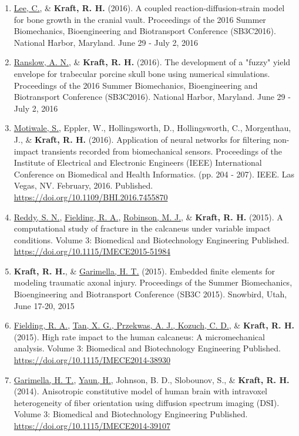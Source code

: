 \documentclass[a4paper,10pt]{article}
\begin{document}
\begin{enumerate}
  \item \underline{Lee, C.}, \&
 \textbf{\textbf{Kraft,} R. H.} (2016). A coupled reaction-diffusion-strain model for bone growth in the cranial vault. Proceedings of the 2016 Summer Biomechanics, Bioengineering and Biotransport Conference (SB3C2016).    
National Harbor, Maryland. June 29 - July 2, 2016
  \item \underline{Ranslow, A. N.}, \&
 \textbf{\textbf{Kraft,} R. H.} (2016). The development of a "fuzzy" yield envelope for trabecular porcine skull bone using numerical simulations. Proceedings of the 2016 Summer Biomechanics, Bioengineering and Biotransport Conference (SB3C2016).    
National Harbor, Maryland. June 29 - July 2, 2016
  \item \underline{Motiwale, S.}, Eppler, W., Hollingsworth, D., Hollingsworth, C., Morgenthau, J., \&
 \textbf{\textbf{Kraft,} R. H.} (2016). Application of neural networks for filtering non-impact transients recorded from biomechanical sensors. Proceedings of the Institute of Electrical and Electronic Engineers (IEEE) International Conference on Biomedical and Health Informatics. (pp. 204 - 207). IEEE.  
Las Vegas, NV. February, 2016. Published. \url{https://doi.org/10.1109/BHI.2016.7455870}
  \item \underline{Reddy, S. N.}, \underline{Fielding, R. A.}, \underline{Robinson, M. J.}, \&
 \textbf{\textbf{Kraft,} R. H.} (2015). A computational study of fracture in the calcaneus under variable impact conditions. Volume 3: Biomedical and Biotechnology Engineering Published. \url{https://doi.org/10.1115/IMECE2015-51984}
  \item \textbf{\textbf{Kraft,} R. H.}, \&
 \underline{Garimella, H. T.} (2015). Embedded finite elements for modeling traumatic axonal injury. Proceedings of the Summer Biomechanics, Bioengineering and Biotransport Conference    (SB3C 2015).    
Snowbird, Utah, June 17-20, 2015
  \item \underline{Fielding, R. A.}, \underline{Tan, X. G., Przekwas, A. J., Kozuch, C. D.}, \&
 \textbf{\textbf{Kraft,} R. H.} (2015). High rate impact to the human calcaneus: A micromechanical analysis. Volume 3: Biomedical and Biotechnology Engineering Published. \url{https://doi.org/10.1115/IMECE2014-38930}
  \item \underline{Garimella, H. T.}, \underline{Yaun, H.}, Johnson, B. D., Slobounov, S., \&
 \textbf{\textbf{Kraft,} R. H.} (2014). Anisotropic constitutive model of human brain with intravoxel heterogeneity of fiber orientation using diffusion spectrum imaging (DSI). Volume 3: Biomedical and Biotechnology Engineering Published. \url{https://doi.org/10.1115/IMECE2014-39107}

\end{enumerate}
\end{document}
